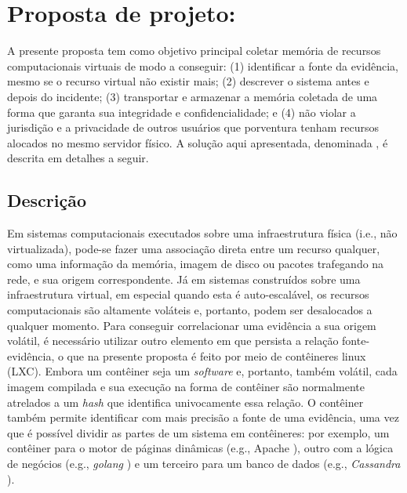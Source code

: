 \chapter{Proposta de projeto: \fancyname}
\label{chp:proposta}

A presente proposta tem como objetivo principal coletar memória de recursos computacionais virtuais de modo a conseguir: 
(1) identificar a fonte da evidência, mesmo se o recurso virtual não existir mais; 
(2) descrever o sistema antes e depois do incidente;
(3) transportar e armazenar a memória coletada de uma forma que garanta sua integridade e confidencialidade; e
(4) não violar a jurisdição e a privacidade de outros usuários que porventura tenham recursos alocados no mesmo servidor físico.
%
A solução aqui apresentada, denominada \fancyname, é descrita em detalhes a seguir.

\section{Descrição}
\label{sec:proposta-desc}

Em sistemas computacionais executados sobre uma infraestrutura física (i.e., não virtualizada), pode-se fazer uma associação direta entre um recurso qualquer, como uma informação da memória, imagem de disco ou pacotes trafegando na rede, e sua origem correspondente.
%
Já em sistemas construídos sobre uma infraestrutura virtual, em especial quando esta é auto-escalável, os recursos computacionais são altamente voláteis e, portanto, podem ser desalocados a qualquer momento.
%
Para conseguir correlacionar uma evidência a sua origem volátil, é necessário utilizar outro elemento em que persista a relação fonte-evidência, o que na presente proposta é feito por meio de contêineres linux (LXC).
%
Embora um contêiner seja um \textit{software} e, portanto, também volátil, cada imagem compilada e sua execução na forma de contêiner são normalmente atrelados a um \textit{hash} que identifica univocamente essa relação.
%
O contêiner também permite identificar com mais precisão a fonte de uma evidência, uma vez que é possível dividir as partes de um sistema em contêineres: por exemplo, um contêiner para o motor de páginas dinâmicas (e.g., Apache%
), outro com a lógica de negócios (e.g., \textit{golang}%
) e um terceiro para um banco de dados (e.g., \textit{Cassandra}%
).

